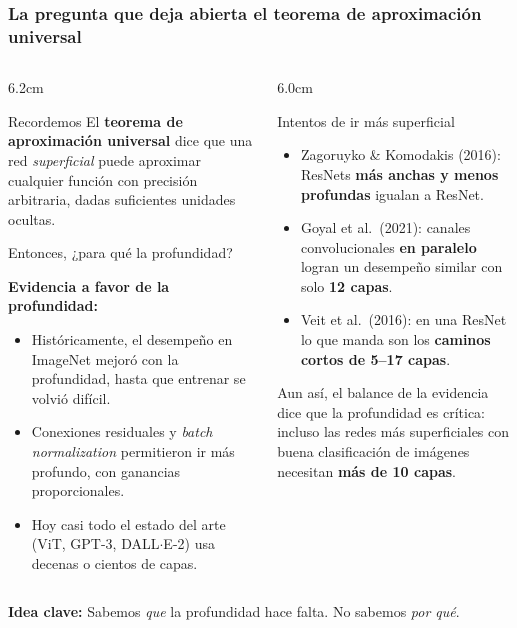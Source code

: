 \documentclass[aspectratio=169, 10pt]{beamer}
\newcommand{\idea}[1]{%
	\begin{tcolorbox}[colback=AccentGreen!6, colframe=AccentGreen, arc=3pt,
		width=\textwidth, boxsep=1pt, left=5pt, right=5pt, top=2pt, bottom=2pt,
		fontupper=\small]
		\RaggedRight\textbf{Idea clave:} #1
	\end{tcolorbox}
}
\begin{document}
\begin{frame}
\frametitle{La pregunta que deja abierta el teorema de aproximación universal}
\scriptsize %
\begin{columns}[T]
\begin{column}{6.2cm}
\begin{block}{Recordemos}
\footnotesize
El \textbf{teorema de aproximaci\'on universal} dice que una red \emph{superficial} puede aproximar cualquier funci\'on con precisi\'on arbitraria, dadas suficientes unidades ocultas.
\vspace{0.3em}

Entonces, ¿para qu\'e la profundidad?
\end{block}
\vspace{0.2em}
\textbf{Evidencia a favor de la profundidad:}
\begin{itemize}
	\item Hist\'oricamente, el desempe\~no en ImageNet mejor\'o con la profundidad, hasta que entrenar se volvi\'o dif\'icil.
	\item Conexiones residuales y \emph{batch normalization} permitieron ir m\'as profundo, con ganancias proporcionales.
	\item Hoy casi todo el estado del arte (ViT, GPT-3, DALL$\cdot$E-2) usa decenas o cientos de capas.
\end{itemize}
\end{column}
\begin{column}{6.0cm}
\begin{alertblock}{Intentos de ir más superficial}
\footnotesize
\begin{itemize}
	\item Zagoruyko \& Komodakis (2016): ResNets \textbf{m\'as anchas y menos profundas} igualan a ResNet.
	\item Goyal et al.\ (2021): canales convolucionales \textbf{en paralelo} logran un desempe\~no similar con solo \textbf{12 capas}.
	\item Veit et al.\ (2016): en una ResNet lo que manda son los \textbf{caminos cortos de 5--17 capas}.
\end{itemize}
\end{alertblock}
\vspace{0.3em}
\footnotesize
Aun as\'i, el balance de la evidencia dice que la profundidad es cr\'itica: incluso las redes m\'as superficiales con buena clasificaci\'on de im\'agenes necesitan \textbf{m\'as de 10 capas}.
\end{column}
\end{columns}
\vspace{0.2em}
\idea{Sabemos \emph{que} la profundidad hace falta. No sabemos \emph{por qu\'e}.}
\end{frame}
\end{document}

